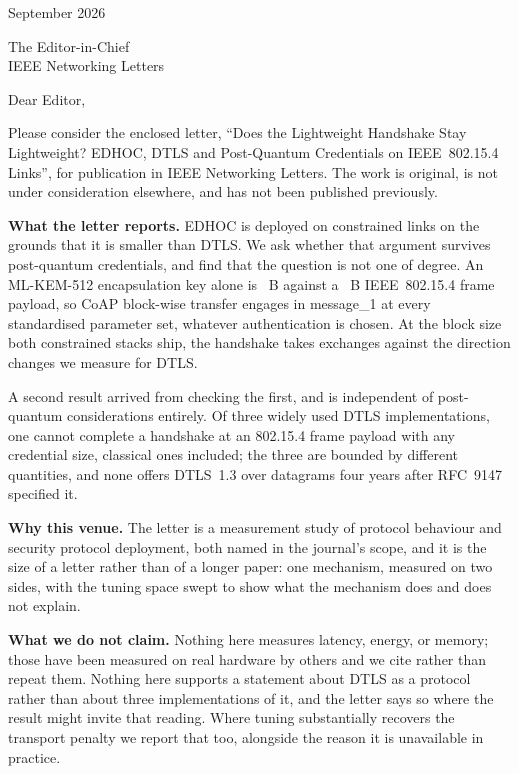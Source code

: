 \documentclass[11pt]{article}
\begin{document}
\hfill September 2026

\vspace{-1em}
The Editor-in-Chief\\
IEEE Networking Letters

\vspace{0.6em}
Dear Editor,

Please consider the enclosed letter, ``Does the Lightweight Handshake Stay Lightweight?
EDHOC, DTLS and Post-Quantum Credentials on IEEE~802.15.4 Links'', for publication in IEEE
Networking Letters. The work is original, is not under consideration elsewhere, and has not
been published previously.

\textbf{What the letter reports.} EDHOC is deployed on constrained links on the grounds that
it is smaller than DTLS. We ask whether that argument survives post-quantum credentials, and
find that the question is not one of degree. An ML-KEM-512 encapsulation key alone is
\numKemFiveOneTwo~B against a \numFramePayload~B IEEE~802.15.4 frame payload, so CoAP
block-wise transfer engages in message\_1 at every standardised parameter set, whatever
authentication is chosen. At the block size both constrained stacks ship, the handshake takes
\numExchTotalPQ{} exchanges against the \numDtlsMeasTurns{} direction changes we measure for
DTLS.

A second result arrived from checking the first, and is independent of post-quantum
considerations entirely. Of three widely used DTLS implementations, one cannot complete a
handshake at an 802.15.4 frame payload with any credential size, classical ones included; the
three are bounded by different quantities, and none offers DTLS~1.3 over datagrams four years
after RFC~9147 specified it.

\textbf{Why this venue.} The letter is a measurement study of protocol behaviour and security
protocol deployment, both named in the journal's scope, and it is the size of a letter rather
than of a longer paper: one mechanism, measured on two sides, with the tuning space swept to
show what the mechanism does and does not explain.

\textbf{What we do not claim.} Nothing here measures latency, energy, or memory; those have
been measured on real hardware by others and we cite rather than repeat them. Nothing here
supports a statement about DTLS as a protocol rather than about three implementations of it,
and the letter says so where the result might invite that reading. Where tuning substantially
recovers the transport penalty we report that too, alongside the reason it is unavailable in
practice.
\end{document}
